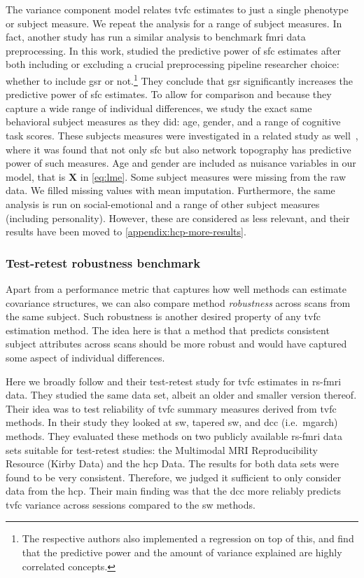 The variance component model relates \gls{tvfc} estimates to just a single phenotype or subject measure.
We repeat the analysis for a range of subject measures.
%
In fact, another study has run a similar analysis to benchmark \gls{fmri} data preprocessing.
In this work, \textcite{Li2019a} studied the predictive power of \gls{sfc} estimates after both including or excluding a crucial preprocessing pipeline researcher choice: whether to include \gls{gsr} or not.\footnote{The respective authors also implemented a regression on top of this, and find that the predictive power and the amount of variance explained are highly correlated concepts.}
They conclude that \gls{gsr} significantly increases the predictive power of \gls{sfc} estimates.
To allow for comparison and because they capture a wide range of individual differences, we study the exact same behavioral subject measures as they did: age, gender, and a range of cognitive task scores.
These subjects measures were investigated in a related study as well~\parencite{Kong2019}, where it was found that not only \gls{sfc} but also network topography has predictive power of such measures.
%
Age and gender are included as nuisance variables in our model, that is $\mathbf{X}$ in \cref{eq:lme}.
Some subject measures were missing from the raw data.
We filled missing values with mean imputation.
%
Furthermore, the same analysis is run on social-emotional and a range of other subject measures (including personality).
However, these are considered as less relevant, and their results have been moved to \cref{appendix:hcp-more-results}.

\subsubsection{Test-retest robustness benchmark}

Apart from a performance metric that captures how well methods can estimate covariance structures, we can also compare method \emph{robustness} across scans from the same subject.
Such robustness is another desired property of any \gls{tvfc} estimation method.
The idea here is that a method that predicts consistent subject attributes across scans should be more robust and would have captured some aspect of individual differences.

Here we broadly follow \textcite{Choe2017} and their test-retest study for \gls{tvfc} estimates in \gls{rs-fmri} data.
They studied the same data set, albeit an older and smaller version thereof.
%
Their idea was to test reliability of \gls{tvfc} summary measures derived from \gls{tvfc} methods.
In their study they looked at \gls{sw}, tapered \gls{sw}, and \gls{dcc} (i.e.~\gls{mgarch}) methods.
They evaluated these methods on two publicly available \gls{rs-fmri} data sets suitable for test-retest studies: the Multimodal MRI Reproducibility Resource (Kirby Data) and the \gls{hcp} Data.
The results for both data sets were found to be very consistent.
Therefore, we judged it sufficient to only consider data from the \gls{hcp}.
Their main finding was that the \gls{dcc} more reliably predicts \gls{tvfc} variance across sessions compared to the \gls{sw} methods.

